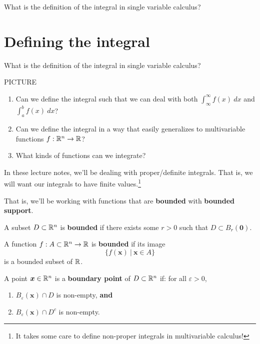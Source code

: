  \begin{motivating}
    What is the definition of the integral in single variable calculus? 
    \end{motivating}
    

\section{Defining the integral}

\begin{motivating}
    What is the definition of the integral in single variable calculus? 
\end{motivating}

PICTURE

    \begin{enumerate}
        \item Can we define the integral such that we can deal with both  $\int_\infty^\infty f(x) \ dx$ and $\int_a^b f(x) \ dx$?
        \item Can we define the integral in a way that easily generalizes to multivariable functions $f: \mathbb{R}^n \to \mathbb{R}$?
        \item What kinds of functions can we integrate? 
    \end{enumerate}

In these lecture notes, we'll be dealing with proper/definite integrals.  That is, we will want our integrals to have finite values.\footnote{It takes some care to define non-proper integrals in multivariable calculus!}

That is, we'll be working with functions that are \textbf{bounded} with \textbf{bounded support}.

\begin{definition}
A subset $D \subset \mathbb{R}^n$ is \textbf{bounded} if there exists some $r > 0$ such that $D \subset B_r(\bm{0})$.
\end{definition}

    
    
    \begin{definition}
    A function $f: A \subset \mathbb{R}^n \to \mathbb{R}$ is \textbf{bounded} if its image $$\{f(\bm{x}) \ | \ \bm{x} \in A \}$$ is a bounded subset of $\mathbb{R}$.
    \end{definition}


\begin{definition}
A point $\bm{x} \in \mathbb{R}^n$ is a \textbf{boundary point} of $D \subset \mathbb{R}^n$ if: for all $\varepsilon > 0$,

\begin{enumerate}
    \item $B_\varepsilon(\bm{x}) \cap D$ is non-empty, \textbf{and}
    \item $B_\varepsilon(\bm{x}) \cap D^{c}$ is non-empty.
\end{enumerate}
\end{definition}
    
